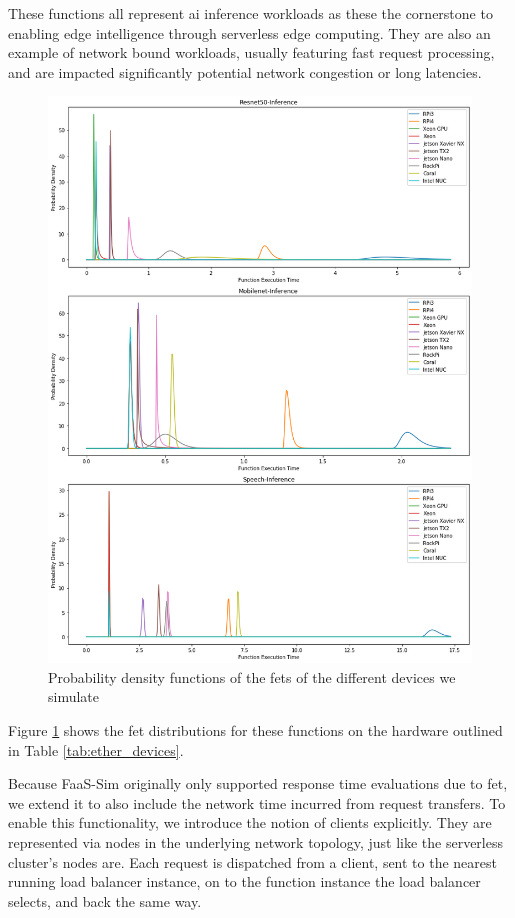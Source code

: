 These functions all represent \gls{ai} inference workloads as these the cornerstone to enabling edge intelligence\cite{rauschEdgeIntelligenceConvergence2019} through serverless edge computing.
They are also an example of network bound workloads, usually featuring fast request processing, and are impacted significantly potential network congestion or long latencies.
\begin{figure}
    \centering
    \includegraphics[width=\linewidth]{graphics/graphs/devices_fets.png}
    \caption{Probability density functions of the \glspl{fet} of the different devices we simulate}
    \label{fig:devices_fets}
\end{figure}

Figure \ref{fig:devices_fets}
shows the \gls{fet} distributions for these functions on the hardware outlined in Table \ref{tab:ether_devices}.

Because FaaS-Sim originally only supported response time evaluations due to \gls{fet}, we extend it to also include the network time incurred from request transfers.
To enable this functionality, we introduce the notion of clients explicitly.
They are represented via nodes in the underlying network topology, just like the serverless cluster's nodes are.
Each request is dispatched from a client, sent to the nearest running load balancer instance, on to the function instance the load balancer selects, and back the same way.

